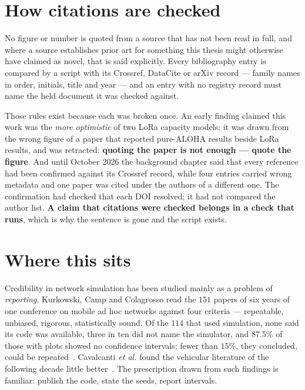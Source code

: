 \section{How citations are checked}\label{sec:citations}

No figure or number is quoted from a source that has not been read in full, and where a source
establishes prior art for something this thesis might otherwise have claimed as novel, that is
said explicitly. Every bibliography entry is compared by a script with its Crossref, DataCite or
arXiv record --- family names in order, initials, title and year --- and an entry with no
registry record must name the held document it was checked against.

Those rules exist because each was broken once. An early finding claimed this work was the
\emph{more optimistic} of two LoRa capacity models; it was drawn from the wrong figure of a paper
that reported pure-ALOHA results beside LoRa results, and was retracted: \textbf{quoting the
paper is not enough --- quote the figure}. And until October 2026 the background chapter said that every
reference had been confirmed against its Crossref record, while four entries carried wrong
metadata and one paper was cited under the authors of a different one. The confirmation had
checked that each DOI resolved; it had not compared the author list. \textbf{A claim that
citations were checked belongs in a check that runs}, which is why the sentence is gone and the
script exists.

\section{Where this sits}\label{sec:credibility}

Credibility in network simulation has been studied mainly as a problem of \emph{reporting}.
Kurkowski, Camp and Colagrosso read the $151$ papers of six years of one conference on mobile ad
hoc networks against four criteria --- repeatable, unbiased, rigorous, statistically sound.
Of the $114$ that used simulation, none said its code was available, three in ten did not name
the simulator, and $87.5\%$ of those with plots showed no confidence intervals; fewer than
$15\%$, they concluded, could be repeated~\cite{kurkowski2005incredibles}. Cavalcanti
\emph{et al.} found the vehicular literature of the following decade little
better~\cite{cavalcanti2018vanet}. The prescription drawn from such findings is familiar: publish the code,
state the seeds, report intervals.


